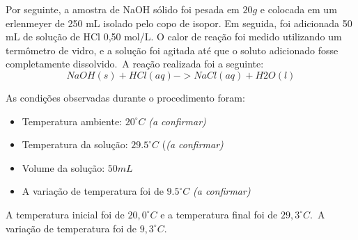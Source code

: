         \indent Por seguinte, a amostra de NaOH sólido foi pesada em $20g$ e colocada em um erlenmeyer de 250 mL isolado pelo copo de isopor. Em seguida, foi adicionada 50 mL de solução de HCl 0,50 mol/L. O calor de reação foi medido utilizando um termômetro de vidro, e a solução foi agitada até que o soluto adicionado fosse completamente dissolvido.\ A reação realizada foi a seguinte:\
        \begin{equation}
            {NaOH(s) + HCl(aq) -> NaCl(aq) + H2O(l)}
            \label{eq:equation_principal2}
        \end{equation}
    	
    	\indent As condições observadas durante o procedimento foram:
    	\begin{itemize}
    		\item Temperatura ambiente: $20^{\circ}C$ \textit{(a confirmar)}
    		\item Temperatura da solução: $29.5^{\circ}C$ (\textit{(a confirmar)}
    		\item Volume da solução: $50 mL$
    		\item A variação de temperatura foi de $9.5^{\circ}C$ \textit{(a confirmar)}
    	\end{itemize}
    
    	\indent A temperatura inicial foi de $20,0^{\circ} C$ e a temperatura final foi de $29,3^{\circ}C$.\ A variação de temperatura foi de $9,3^{\circ} C$.\\
                

